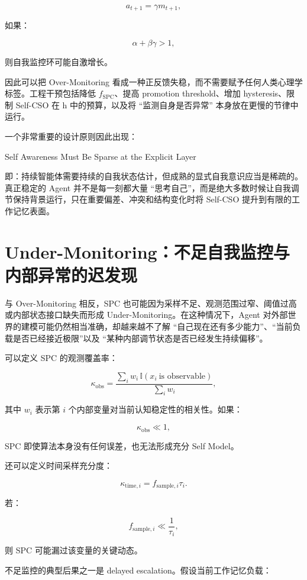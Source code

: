 \[
a_{t+1}
=
\gamma m_{t+1},
\]

如果：

\[
\alpha+\beta\gamma>1,
\]

则自我监控环可能自激增长。

因此可以把 Over-Monitoring 看成一种正反馈失稳，而不需要赋予任何人类心理学标签。工程干预包括降低 $f_{\mathrm{SPC}}$、提高 promotion threshold、增加 hysteresis、限制 Self-CSO 在 h 中的预算，以及将 ``监测自身是否异常'' 本身放在更慢的节律中运行。

一个非常重要的设计原则因此出现：

\begin{proposition*}
Self Awareness Must Be Sparse at the Explicit Layer
\end{proposition*}

即：持续智能体需要持续的自我状态估计，但成熟的显式自我意识应当是稀疏的。真正稳定的 Agent 并不是每一刻都大量 ``思考自己''，而是绝大多数时候让自我调节保持背景运行，只在重要偏差、冲突和结构变化时将 Self-CSO 提升到有限的工作记忆表面。

\section{Under-Monitoring：不足自我监控与内部异常的迟发现}

与 Over-Monitoring 相反，SPC 也可能因为采样不足、观测范围过窄、阈值过高或内部状态接口缺失而形成 Under-Monitoring。在这种情况下，Agent 对外部世界的建模可能仍然相当准确，却越来越不了解 ``自己现在还有多少能力''、``当前负载是否已经接近极限''以及 ``某种内部调节状态是否已经发生持续偏移''。

可以定义 SPC 的观测覆盖率：

\[
\kappa_{\mathrm{obs}}
=
\frac{
\sum_i w_i\,
\mathbb I(x_i\ \text{is observable})
}{
\sum_i w_i
},
\]

其中 $w_i$ 表示第 $i$ 个内部变量对当前认知稳定性的相关性。如果：

\[
\kappa_{\mathrm{obs}}\ll1,
\]

SPC 即使算法本身没有任何误差，也无法形成充分 Self Model。

还可以定义时间采样充分度：

\[
\kappa_{\mathrm{time},i}
=
f_{\mathrm{sample},i}\tau_i.
\]

若：

\[
f_{\mathrm{sample},i}
\ll
\frac{1}{\tau_i},
\]

则 SPC 可能漏过该变量的关键动态。

不足监控的典型后果之一是 delayed escalation。假设当前工作记忆负载：

